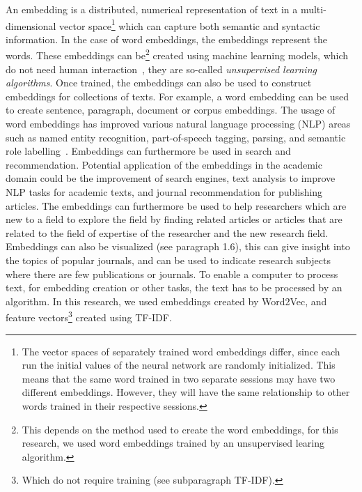 \documentclass[../../Thesis.tex]{subfiles}
\begin{document}
An embedding is a distributed, numerical representation of text in a multi-dimensional vector space\footnote{The vector spaces of separately trained word embeddings differ, since each run the initial values of the neural network are randomly initialized. This means that the same word trained in two separate sessions may have two different embeddings. However, they will have the same relationship to other words trained in their respective sessions.} which can capture both semantic and syntactic information\cite{mikolov2013distributed}. In the case of word embeddings, the embeddings represent the words. These embeddings can be\footnote{This depends on the method used to create the word embeddings, for this research, we used word embeddings trained by an unsupervised learing algorithm.} created using machine learning models, which do not need human interaction~\cite{lai2016generate}, they are so-called \textit{unsupervised learning algorithms}. Once trained, the embeddings can also be used to construct embeddings for collections of texts. For example, a word embedding can be used to create sentence, paragraph, document or corpus embeddings. The usage of word embeddings has improved various natural language processing (NLP) areas such as named entity recognition, part-of-speech tagging, parsing, and semantic role labelling~\cite{luong2013better}. Embeddings can furthermore be used in search and recommendation. Potential application of the embeddings in the academic domain could be the improvement of search engines, text analysis to improve NLP tasks for academic texts, and journal recommendation for publishing articles. The embeddings can furthermore be used to help researchers which are new to a field to explore the field by finding related articles or articles that are related to the field of expertise of the researcher and the new research field. Embeddings can also be visualized (see paragraph 1.6), this can give insight into the topics of popular journals, and can be used to indicate research subjects where there are few publications or journals.
To enable a computer to process text, for embedding creation or other tasks, the text has to be processed by an algorithm. In this research, we used embeddings created by Word2Vec, and feature vectors\footnote{Which do not require training (see subparagraph TF-IDF).} created using TF-IDF.
\end{document}
